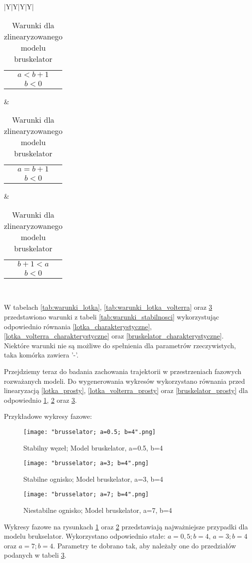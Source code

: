 \documentclass[10pt, a4paper, twoside, onecolumn]{article}
\numberwithin{equation}{section}
\begin{document}
\begin{table}[H]
\begin{tabularx}{\textwidth}{|Y|Y|Y|Y|}
{\begin{tabularx}{\columnwidth}{c}
				\(a<b+1\) \\
				\(b<0\)
			\end{tabularx}}
			& 
			{\begin{tabularx}{\columnwidth}{c} %
				\(a=b+1\) \\
				\(b<0\)
			\end{tabularx}}
			&
			{\begin{tabularx}{\columnwidth}{c} %
				\(b+1<a\) \\
				\(b<0\)
			\end{tabularx}}
			\\ 
		\end{tabularx}
		\caption{Warunki dla zlinearyzowanego modelu bruskelator}
		\label{tab:warunki_bruskelator}
	\end{table}
	W tabelach \ref{tab:warunki_lotka}, \ref{tab:warunki_lotka_volterra} oraz \ref{tab:warunki_bruskelator} przedstawiono warunki z tabeli \ref{tab:warunki_stabilnosci} wykorzystując odpowiednio równania \eqref{lotka_charakterystyczne}, \eqref{lotka_volterra_charakterystyczne} oraz \eqref{bruskelator_charakterystyczne}. Niektóre warunki nie są możliwe do spełnienia dla parametrów rzeczywistych, taka komórka zawiera '-'. \par
	Przejdziemy teraz do badania zachowania trajektorii w przestrzeniach fazowych rozważanych modeli. Do wygenerowania wykresów wykorzystano równania przed linearyzacją \eqref{lotka_prosty}, \eqref{lotka_volterra_prosty} oraz \eqref{bruskelator_prosty} dla odpowiednio \ref{fig:stabilny_wezel}, \ref{fig:stabilne_ognisko} oraz \ref{fig:niestabilne_ognisko}. \par
	Przykładowe wykresy fazowe:
	\begin{figure}[H]
		\centering
		\texttt{[image: "brusselator; a=0.5; b=4".png]}
		\caption{Stabilny węzeł; Model bruskelator, a=0.5, b=4}
		\label{fig:stabilny_wezel}
	\end{figure}
	\begin{figure}[H]
		\centering
		\texttt{[image: "brusselator; a=3; b=4".png]}
		\caption{Stabilne ognisko; Model bruskelator, a=3, b=4}
		\label{fig:stabilne_ognisko}
	\end{figure}
	\begin{figure}[H]
		\centering
		\texttt{[image: "brusselator; a=7; b=4".png]}
		\caption{Niestabilne ognisko; Model bruskelator, a=7, b=4}
		\label{fig:niestabilne_ognisko}
	\end{figure}
	Wykresy fazowe na rysunkach \ref{fig:stabilny_wezel} oraz \ref{fig:stabilne_ognisko} przedstawiają najważniejsze przypadki dla modelu brukselator. Wykorzystano odpowiednio stałe: \(a=0,5; b=4\), \(a=3; b=4\) oraz \(a=7; b=4\). Parametry te dobrano tak, aby należały one do przedziałów podanych w tabeli \ref{tab:warunki_bruskelator}. \par
\end{document}

